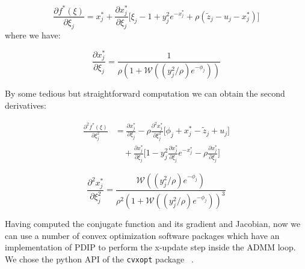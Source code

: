 \documentclass[letterpaper]{article} %
\newcommand{\citep}{\cite}
\newcommand{\autoref}{\Cref}
\begin{document}

\begin{equation}
\frac{\partial f^*(\xi)}{\partial \xi_j}  =  x^*_j  + \frac{\partial x^*_j}{\partial \xi_j} \bigg[ \xi_j -1 + y_j^2 e^{-x_j^*} + \rho (\tilde{z}_j - u_j - x_j^*) \bigg]
\label{eq:d_f*_start}
\end{equation}
where we have:

\begin{equation}
\frac{\partial x_j^*}{\partial \xi_j}  = \frac{1}{\rho(1+\mathscr{W}((y_j^2/\rho) e^{-\phi_j} ))}
\label{eq:d_x*_start}
\end{equation}

By some tedious but straightforward computation we can obtain the second derivatives:


\begin{align}
\frac{\partial^2 f^*(\xi)}{\partial \xi_j^2} & =  \frac{\partial x_j^*}{\partial \xi_j} - \rho \frac{\partial^2 x_j^*}{\partial \xi_j^2} \bigg[ \phi_j +x_j^* - \tilde{z}_j + u_j \bigg]\\
& \quad + \frac{\partial x_j^*}{\partial \xi_j} \bigg[ 1-y_j^2 \frac{\partial x_j^*}{\partial \xi_j} e^{-x_j^*} -\rho \frac{\partial x_j^*}{\partial \xi_j} \bigg]
\label{eq:d2_f*_start}
\end{align}


\begin{equation}
\frac{\partial^2 x_j^*}{\partial \xi_j^2}  = \frac{\mathscr{W}((y_j^2/\rho) e^{-\phi_j} )}{\rho^2(1+\mathscr{W}((y_j^2/\rho) e^{-\phi_j} ))^3}
\label{eq:d2_x*_start}
\end{equation}

Having computed the conjugate function and its gradient and Jacobian, now we can use a number of convex optimization software packages which have an implementation of PDIP to perform the x-update step inside the ADMM loop. We chose the python API of the \texttt{cvxopt} package ~\citep{andersen_cvxopt:_2013}. 

\end{document}

